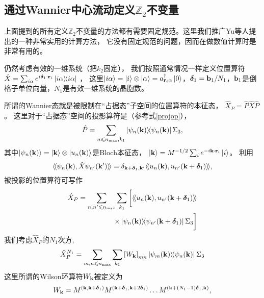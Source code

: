 \subsection{通过Wannier中心流动定义$\mathbb Z_2$不变量}
上面提到的所有定义$\mathbb Z_2$不变量的方法都有需要固定规范。这里我们推广Yu等人提出的一种非常实用的计算方法\cite{Yu2011}，
它没有固定规范的问题，因而在做数值计算时是非常有用的。

仍然考虑有效的一维系统（把$k_2$固定），
我们按照通常情况一样定义位置算符$\hat X=\sum_{i\alpha}e^{i \boldsymbol{\delta}_1\cdot\vb r_i}\ketbra{i\alpha}{i\alpha}$ \cite{Resta2000}，
这里$\ket{i\alpha}=\ket{i}\otimes\ket{\alpha}=a^\dagger_{\vb r_i \alpha}\ket{0}$，$\boldsymbol{\delta}_1=\vb b_1/N_1$，$\vb b_1$是倒格子单位向量，$N_1$是有效一维系统的晶胞数。

所谓的Wannier态就是被限制在“占据态”子空间的位置算符的本征态\cite{Kivelson1982}，
$\hat X_P=\hat P\hat X \hat P$。
这里对于“占据态”空间的投影算符是（参考式\eqref{projop}），
\begin{equation}
	\hat P = \sum_{n\leqslant n_{\textnormal{max}},k_1} \ketbra{\psi_n(\vb k)}{\psi_n(\vb k)}\Sigma_3,\nonumber
\end{equation}
其中$\ket{\psi_n(\vb k)}=\ket{\vb k}\otimes\ket{u_n(\vb k)}$是Bloch本征态，
$\ket{\vb k}=M^{-1/2} \sum_i e^{-i\vb k\cdot\vb r_i}\ket{i} $。
利用
\begin{equation*}
	\langle\!\langle \psi_{n}(\vb k),\hat X \psi_{n'}(\vb k') \rangle\!\rangle = \delta_{\vb k+\boldsymbol{\delta}_1,\vb k'}\langle\!\langle u_{n}(\vb k),u_{n'}(\vb k+\boldsymbol{\delta}_1) \rangle\!\rangle,
\end{equation*}
被投影的位置算符可写作
\begin{equation*}
\begin{split}
	\hat X_P=\sum_{n,n'\leqslant n_{\textnormal{max}}}\sum_{k_1}\bigg[\langle\!\langle u_{n}(\vb k),u_{n'}(\vb k+\boldsymbol{\delta}_1) \rangle\!\rangle\\
	\times \ketbra{\psi_{n}(\vb k)}{\psi_{n'}(\vb k+\boldsymbol{\delta}_1)}\Sigma_3\bigg]
\end{split}
\end{equation*}
我们考虑$\hat X_P$的$N_1$次方,
\begin{equation*}
	\hat X_P^{N_1}=\sum_{m,n\leq n_\tmax}\sum_{k_1}\bqty{W_{\vb k}}_{mn}\ketbra{\psi_m(\vb k)}{\psi_n(\vb k)}\Sigma_3
\end{equation*}
这里所谓的Wilson环算符$W_{\vb k}$被定义为
\begin{equation}
	W_{\vb k} =M^{(\vb k,\vb k+\boldsymbol{\delta}_1)} M^{(\vb k+\boldsymbol{\delta}_1,\vb k+2\boldsymbol{\delta}_1)}  \dots  M^{(\vb k+(N_1-1)\boldsymbol{\delta}_1,\vb k)},\label{wilsonloop}
\end{equation}

